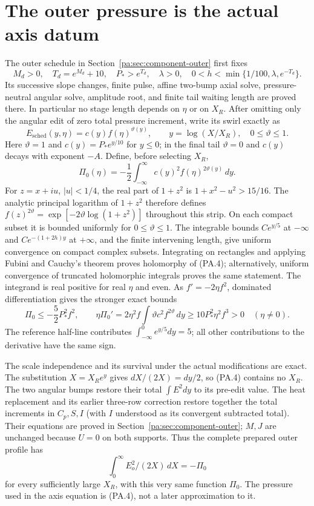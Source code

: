 \documentclass[10pt,a4paper]{article}
\begin{document}
\section{The outer pressure is the actual axis datum}
The outer schedule in Section~\ref{pa:sec:component-outer} first fixes
\[
 M_d>0,\quad T_d=e^{M_d}+10,\quad P_*>e^{T_d},\quad
 \lambda>0,\quad 0<h<\min\{1/100,\lambda,e^{-T_d}\}.                 \tag{PA.3}
\]
Its successive slope changes, finite pulse, affine two-bump axial solve,
pressure-neutral angular solve, amplitude root, and finite tail waiting length
are proved there. In particular no stage length depends on $\eta$ or on $X_R$.
After omitting only the angular edit of zero total pressure increment, write
its swirl exactly as
\[
 E_{\mathrm{sched}}(y,\eta)=c(y)f(\eta)^{\vartheta(y)},\qquad
 y=\log(X/X_R),\quad 0\le\vartheta\le1.
\]
Here $\vartheta=1$ and $c(y)=P_*e^{y/10}$ for $y\le0$; in the
final tail $\vartheta=0$ and $c(y)$ decays with exponent $-A$.
Define, before selecting $X_R$,
\[
 \Pi_0(\eta)=-\frac12\int_{-\infty}^{\infty}
                  c(y)^2f(\eta)^{2\vartheta(y)}\,dy.               \tag{PA.4}
\]
For $z=x+iu$, $|u|<1/4$, the real part of $1+z^2$ is
$1+x^2-u^2>15/16$. The analytic principal logarithm of $1+z^2$ therefore
defines $f(z)^{2\vartheta}=\exp[-2\vartheta\log(1+z^2)]$ throughout
this strip. On each compact subset it is bounded uniformly for
$0\le\vartheta\le1$. The integrable bounds $C e^{y/5}$ at $-\infty$
and $C e^{-(1+2h)y}$ at $+\infty$, and the finite intervening length,
give uniform convergence on compact complex subsets. Integrating on rectangles
and applying Fubini and Cauchy's theorem proves holomorphy of (PA.4); alternatively,
uniform convergence of truncated holomorphic integrals proves the same statement.
The integrand is real positive for real $\eta$ and even. As $f'=-2\eta f^2$,
dominated differentiation gives the stronger exact bounds
\[
 \Pi_0\le-\frac52P_*^2f^2,\qquad
 \eta\Pi_0'=2\eta^2 f\int\vartheta c^2f^{2\vartheta}\,dy
       \ge10P_*^2\eta^2 f^3>0\quad(\eta\ne0).                    \tag{PA.5}
\]
The reference half-line contributes $\int_{-\infty}^0e^{y/5}dy=5$;
all other contributions to the derivative have the same sign.

The scale independence and its survival under the actual modifications are exact.
The substitution $X=X_Re^y$ gives $dX/(2X)=dy/2$, so (PA.4) contains no
$X_R$. The two angular bumps restore their total $\int E^2dy$ to its pre-edit
value. The heat replacement and its earlier three-row correction restore together
the total increments in $C_p,S,I$ (with $I$ understood as its convergent
subtracted total). Their equations are proved in
Section~\ref{pa:sec:component-outer}; $M,J$ are unchanged because $U=0$ on both
supports. Thus the complete prepared outer profile has
\[
 \int_0^\infty E_o^2/(2X)\,dX=-\Pi_0                           \tag{PA.6}
\]
for every sufficiently large $X_R$, with this very same function $\Pi_0$.
The pressure used in the axis equation is (PA.4), not a later approximation to it.
\end{document}
